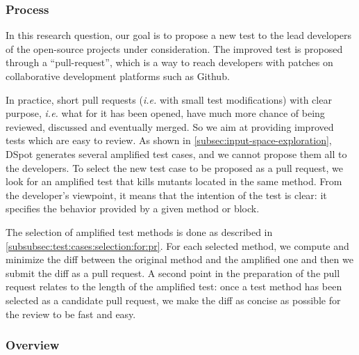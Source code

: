 \documentclass[table,xcdraw,smallextended]{svjour3}
\newcommand{\Iampl}{\emph{I-Amplification}\xspace}
\newcommand{\Aampl}{\emph{A-Amplification}\xspace}
\newcommand{\ie}{\textit{i.e.}\xspace}
\newcommand{\dspot}{DSpot\xspace}
\begin{document}
\subsubsection{Process}

In this research question, our goal is to propose a new test to the lead developers of the open-source projects under consideration. 
The  improved test is proposed through a ``pull-request'', which is a way to reach developers with patches on collaborative development platforms such as Github.

In practice, short pull requests (\ie with small test modifications) with clear purpose, \ie what for it has been opened, have much more chance of being reviewed, discussed and eventually merged. So we aim at providing improved tests which are easy to review.
As shown in \autoref{subsec:input-space-exploration}, \dspot generates several amplified test cases, and we cannot propose them all to the developers.
To select the new test case to be  proposed as a pull request, we look for an amplified test that kills mutants located in the same method.
From the developer's viewpoint, it means that the intention of the test is clear: it specifies the behavior provided by a given method or block.

The selection of amplified test methods is done as described in \autoref{subsubsec:test:cases:selection:for:pr}. For each selected  method, we compute and minimize the diff between the original method and the amplified one and then we submit the diff as a pull request.
A second point in the preparation of the pull request relates to the length of the amplified test: once a test method has been selected as a candidate pull request, we make the diff as concise as possible for the review to be fast and easy.

\subsubsection{Overview}
\end{document}
